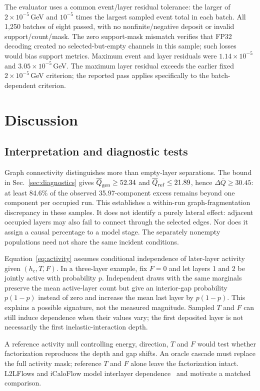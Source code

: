 \documentclass[11pt]{article}
\begin{document}
The evaluator uses a common event/layer residual tolerance: the larger of $2\times10^{-5}$\,GeV and $10^{-5}$ times the largest sampled event total in each batch. All 1,250 batches of eight passed, with no nonfinite/negative deposit or invalid support/count/mask. The zero support-mask mismatch verifies that FP32 decoding created no selected-but-empty channels in this sample; such losses would bias support metrics. Maximum event and layer residuals were $1.14\times10^{-5}$ and $3.05\times10^{-5}$\,GeV. The maximum layer residual exceeds the earlier fixed $2\times10^{-5}$\,GeV criterion; the reported pass applies specifically to the batch-dependent criterion.

\FloatBarrier
\section{Discussion}
\label{sec:discussion}

\subsection{Interpretation and diagnostic tests}

Graph connectivity distinguishes more than empty-layer separations. The bound in Sec.~\ref{sec:diagnostics} gives $\overline Q_{\rm gen}\geq52.34$ and $\overline Q_{\rm ref}\leq21.89$, hence $\Delta\overline Q\geq30.45$: at least 84.6\% of the observed 35.97-component excess remains beyond one component per occupied run. This establishes a within-run graph-fragmentation discrepancy in these samples. It does not identify a purely lateral effect: adjacent occupied layers may also fail to connect through the selected edges. Nor does it assign a causal percentage to a model stage. The separately nonempty populations need not share the same incident conditions.

Equation~\eqref{eq:activity} assumes conditional independence of later-layer activity given $(h_c,T,F)$. In a three-layer example, fix $F=0$ and let layers 1 and 2 be jointly active with probability $p$. Independent draws with the same marginals preserve the mean active-layer count but give an interior-gap probability $p(1-p)$ instead of zero and increase the mean last layer by $p(1-p)$. This explains a possible signature, not the measured magnitude. Sampled $T$ and $F$ can still induce dependence when their values vary; the first deposited layer is not necessarily the first inelastic-interaction depth.

A reference activity null controlling energy, direction, $T$ and $F$ would test whether factorization reproduces the depth and gap shifts. An oracle cascade must replace the full activity mask; reference $T$ and $F$ alone leave the factorization intact. L2LFlows and iCaloFlow model interlayer dependence~\cite{l2lflows,icaloflow} and motivate a matched comparison.
\end{document}
